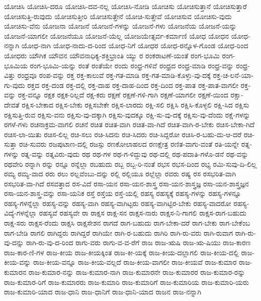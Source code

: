 {ಯೋಚಿಸಿ
ಯೋಚಿಸಿ-ದರೂ
ಯೋಚಿಸಿ-ದವ-ನಲ್ಲ
ಯೋಚಿಸಿ-ನೋಡಿ
ಯೋಚಿಸು
ಯೋಚಿಸುತ್ತಾನೆ
ಯೋಚಿಸುತ್ತಾರೆ
ಯೋಚಿಸುತ್ತಿ-ರುವುದು
ಯೋಚಿಸುತ್ತೀರಿ
ಯೋಚಿಸುತ್ತೇನೆ
ಯೋಚಿ-ಸುತ್ತೇವೆ
ಯೋಚಿಸುವ
ಯೋಚಿಸು-ವುದು
ಯೋಚಿಸು-ವೆನು
ಯೋಜನಾ
ಯೋಜನೆ
ಯೋಜನೆ-ಗಳನ್ನು
ಯೋಜನೆ-ಗಳು
ಯೋಜನೆಯ
ಯೋಜನೆ-ಯನ್ನು
ಯೋಜನೆ-ಯಾಗಲೀ
ಯೋಜನೆಯೂ
ಯೋಜನೆ-ಯೆಲ್ಲ
ಯೋಜಯೇತ್ಸರ್ವ-ಕರ್ಮಾಣಿ
ಯೋಧ
ಯೋಧನ
ಯೋಧ-ನನ್ನಾಗಿ
ಯೋಧ-ನಾಗಿ
ಯೋಧ-ನಾದು-ದ-ರಿಂದ
ಯೋಧ-ನಿಗೆ
ಯೋಧರ
ಯೋಧ-ರನ್ನೊಳ-ಗೊಂಡ
ಯೋಧ-ರಿಂದ
ಯೋಧರು
ಯೌಗಿಕ
ಯೌವನ
ಯೌವನಾಧಿಕ್ಯ-ಶಕ್ತಿಭ್ರಾಂತಿ
ಯ್ಯು
ರ
ರಂಕರಾಟಣೆ-ಯಂತೆ
ರಂಗ-ಭೂಮಿ
ರಂಗ-ಭೂಮಿಯ
ರಂಗ-ಭೂಮಿ-ಯನ್ನು
ರಂತೆ
ರಂತೆಯೇ
ರಂದು
ರಂಧ್ರ-ಗಳಿವೆ
ರಂಧ್ರದ
ರಂಧ್ರ-ಮಾಡಿ
ರಂಧ್ರ-ವನ್ನು
ರಂಧ್ರ-ವಿತ್ತು
ರಂಧ್ರವೂ
ರಂಪ-ವನ್ನು
ರಕ್ತ
ರಕ್ತ-ಕಾಲುವೆ
ರಕ್ತ-ಗತ-ಮಾಡಿ
ರಕ್ತ-ಗತ-ಮಾಡಿ-ಕೊಳ್ಳು-ವು-ದಕ್ಕೆ
ರಕ್ತ-ಚ-ಲನೆ-ಯಾ-ಗು-ವುದು
ರಕ್ತದ
ರಕ್ತ-ದಂಡ
ರಕ್ತ-ದಲ್ಲಿ
ರಕ್ತ-ದಾಹ
ರಕ್ತ-ದಾಹ-ದಿಂದ
ರಕ್ತ-ದಿಂದ
ರಕ್ತ-ಪಾತ
ರಕ್ತ-ಪಾತ-ವಾಗಲೀ
ರಕ್ತ-ವನ್ನು
ರಕ್ತ-ವನ್ನೂ
ರಕ್ಷಕ
ರಕ್ಷಕ-ರಿಲ್ಲದೆ
ರಕ್ಷ-ಕರು
ರಕ್ಷಣೆ
ರಕ್ಷಣೆ-ಗಳಿ-ಗಾಗಿ
ರಕ್ಷಣೆ-ಯಾಗಲೀ
ರಕ್ಷಣೆ-ಯಿಂದ
ರಕ್ಷಾ-ದೇವತೆ
ರಕ್ಷಿಸ-ಬೇಕಾದ
ರಕ್ಷಿಸ-ಬೇಕು
ರಕ್ಷಿಸಬೇಕೇ
ರಕ್ಷಿಸ-ಲಾರದು
ರಕ್ಷಿ-ಸಲಿ
ರಕ್ಷಿಸಿ
ರಕ್ಷಿಸಿ-ಕೊಳ್ಳಲಿ
ರಕ್ಷಿ-ಸಿದ
ರಕ್ಷಿಸು
ರಕ್ಷಿಸುತ್ತಿ-ರುವ
ರಕ್ಷಿಸು-ವನು
ರಕ್ಷಿಸು-ವು-ದಕ್ಕಾಗಿ
ರಕ್ಷಿಸು-ವುದಕ್ಕೂ
ರಕ್ಷಿ-ಸು-ವು-ದಕ್ಕೆ
ರಕ್ಷಿಸು-ವು-ದೆಂದು
ರಕ್ಷೆ-ಗಳನ್ನು
ರಗಳೆ-ಗಳು
ರಚನಾಕ್ರಮ-ವಾಗಲಿ
ರಚನೆ
ರಚಿತ
ರಚಿತ-ವಾಗಿ
ರಚಿತ-ವಾ-ಗಿದೆ
ರಚಿತ-ವಾಗಿ-ರ-ಬೇಕು
ರಚಿಸ-ಬೇಕಾ-ಗಿದೆ
ರಚಿಸ-ಲಾ-ಯಿತು
ರಚಿಸ-ಲಿಲ್ಲ
ರಚಿ-ಸಲು
ರಚಿ-ಸಿದನು
ರಚಿ-ಸಿದರು
ರಚಿ-ಸಿದ್ದರೋ
ರಚಿಸಿ-ರ-ಬಹು-ದು-ಆ-ದರೆ
ರಚಿ-ಸುತ್ತಾ
ರಚಿ-ಸುವರು
ರಜಪುಟಾಣ-ದಲ್ಲಿ
ರಜಸ್ಸು
ರಣಕೋಲಾಹಲದ
ರಣಕ್ಷೇತ್ರ
ರಣಿತ-ವಾಗು-ವಂತೆ
ರತಿ-ಯನ್ನೇ
ರತ್ನ-ಗಳನ್ನು
ರತ್ನ-ವನ್ನು
ರತ್ನವಿರು-ವುದು
ರಥ
ರಥ-ಗಳ
ರಥ-ಗ-ಳಿದ್ದುವು
ರಥ-ದಲ್ಲಿ
ರಥ-ಪದಾತಿ-ಗಳೊ-ಡನೆ
ರಥ-ವನ್ನು
ರಥವೇರಿ
ರನ್ನಾಗಿ
ರನ್ನು
ರನ್ನೂ
ರನ್ನೆಲ್ಲಾ
ರಬಹುದು
ರಬ್ಬ
ರಬ್ಬ-ರಿ-ನಂತೆ
ರಭಸ
ರಭಸ-ದಿಂದ
ರಭ್ಯ
ರಮಿ-ಸುವು-ದಿ-ಲಿಲ್ಲ
ರಮ್ಯ
ರಮ್ಯ-ವಾದ
ರರು
ರಲು
ರಲ್ಲವೆಂಬು-ದನ್ನು
ರಲ್ಲಿ
ರಲ್ಲಿಯೂ
ರಲ್ಲೆಲ್ಲಾ
ರವರು
ರಷ್ಯ
ರಸ
ರಸಭರಿತ-ವಾಗಿ
ರಸಭರಿತ-ವಾ-ಗಿದೆ
ರಸವತ್ತಾದ
ರಸ-ವಿದೆ
ರಸಾ-ಯನ
ರಸಾ-ಯನ-ಶಾಸ್ತ್ರ
ರಸಾ-ಯನ-ಶಾಸ್ತ್ರಜ್ಞ
ರಸಾ-ಯನ-ಶಾಸ್ತ್ರಜ್ಞನ
ರಸಾ-ಯನ-ಶಾಸ್ತ್ರ-ವನ್ನು
ರಸಾ-ಯನಿಕ
ರಸ್ತೆ
ರಸ್ತೆಯ
ರಸ್ತೆ-ಯಲ್ಲಿ
ರಹಸ್ಯ
ರಹಸ್ಯಕ್ಕೆ
ರಹಸ್ಯ-ಗಳನ್ನು
ರಹಸ್ಯ-ಗಳನ್ನೂ
ರಹಸ್ಯ-ಗಳನ್ನೆಲ್ಲಾ
ರಹಸ್ಯ-ವನ್ನು
ರಹಸ್ಯ-ವಾಗಿ
ರಹಸ್ಯ-ವಾಗಿಟ್ಟರು
ರಹಸ್ಯ-ವಾಗಿಟ್ಟಿರ-ಬೇಕು
ರಹಸ್ಯ-ವಾದರೋ
ರಹಸ್ಯ-ವಿದ್ಯೆ-ಗಳನ್ನೆಲ್ಲಾ
ರಹಸ್ಯವೆ
ರಹಸ್ಯವೇ
ರಾ
ರಾಕ್ಷಸ
ರಾಕ್ಷ-ಸನ
ರಾಕ್ಷಸ-ನಾರು
ರಾಕ್ಷಸ-ನಿ-ಗಾಗಲಿ
ರಾಕ್ಷಸ-ರಾಗ-ಬಹುದು
ರಾಕ್ಷ-ಸರು
ರಾಕ್ಷಸ-ರೆಂದು
ರಾಕ್ಷಸಿ
ರಾಕ್ಷಸೇಶನ
ರಾಗದೆ
ರಾಗ-ಬಹುದು
ರಾಗ-ಬೇಕಾ-ದರೆ
ರಾಗ-ಬೇಕು
ರಾಗ-ಬೇಕೆಂಬ
ರಾಗ-ಬೇಡಿ
ರಾಗಲಿ
ರಾಗಿದ್ದರು
ರಾಗಿದ್ದರೆ
ರಾಗಿಯೇ
ರಾಗಿ-ರ-ಬಹುದು
ರಾಗಿರಿ
ರಾಗಿ-ರು-ವರು
ರಾಗಿ-ರುವಾಗ
ರಾಗಿ-ರು-ವು-ದನ್ನು
ರಾಗಿ-ರು-ವು-ದ-ರಿಂದ
ರಾಗು-ವರು
ರಾಗು-ವ-ವ-ರೆಗೆ
ರಾಜ
ರಾಜ-ಋಷಿ
ರಾಜ-ಋ-ಷಿಯು
ರಾಜ-ಕಾರಣ
ರಾಜ-ಕಾರ-ಣಿ-ಗಳ
ರಾಜ-ಕೀಯ
ರಾಜ-ಕೀಯಕ್ಕಿಂತ
ರಾಜ-ಕೀ-ಯಕ್ಕೆ
ರಾಜ-ಕೀಯ-ದಲ್ಲಾಗಲಿ
ರಾಜ-ಕೀಯ-ದಲ್ಲಿ
ರಾಜ-ಕೀಯ-ವನ್ನು
ರಾಜ-ಕೀಯ-ವನ್ನೂ
ರಾಜ-ಕೀಯ-ವಲ್ಲದೆ
ರಾಜ-ಕೀಯ-ವಾಗಲೀ
ರಾಜ-ಕೀಯವೆ
ರಾಜ-ಕುಮಾರ
ರಾಜ-ಕುಮಾರನ
ರಾಜ-ಕುಮಾರ-ನನ್ನು
ರಾಜ-ಕುಮಾರ-ನಾಗಿ
ರಾಜ-ಕುಮಾರನೇ
ರಾಜ-ಕುಮಾರರ
ರಾಜ-ಕುಮಾರ-ರನ್ನು
ರಾಜ-ಕುಮಾರ-ರಿಗೆ
ರಾಜ-ಕುಮಾರರು
ರಾಜ-ಕುಮಾರಿ
ರಾಜ-ಕುಮಾರಿಗೆ
ರಾಜ-ಕುಮಾರಿಯ
ರಾಜ-ಕುಮಾರಿ-ಯರು
ರಾಜ-ಕುಮಾರಿ-ಯಾದ
ರಾಜ-ಧಾನಿ
ರಾಜ-ಧಾನಿಗೆ
ರಾಜ-ಧಾನಿ-ಯಾದ
ರಾಜನ
ರಾಜ-ನನ್ನಾಗಿ
}
